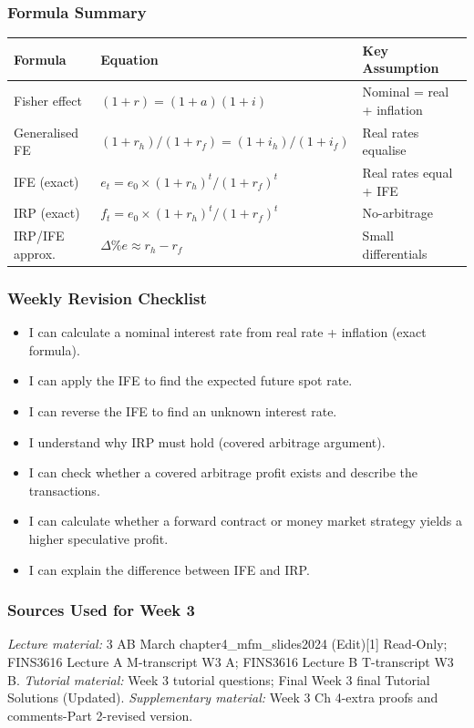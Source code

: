 \documentclass[11pt,a4paper]{article}
\newcommand{\cb}{\(\square\)\enspace}
\begin{document}
\subsubsection*{Formula Summary}
\begin{center}
\begin{tabular}{lll}
\toprule
\textbf{Formula} & \textbf{Equation} & \textbf{Key Assumption} \\
\midrule
Fisher effect & $(1+r) = (1+a)(1+i)$ & Nominal = real + inflation \\
Generalised FE & $(1+r_h)/(1+r_f) = (1+i_h)/(1+i_f)$ & Real rates equalise \\
IFE (exact) & $e_t = e_0 \times (1+r_h)^t/(1+r_f)^t$ & Real rates equal + IFE \\
IRP (exact) & $f_t = e_0 \times (1+r_h)^t/(1+r_f)^t$ & No-arbitrage \\
IRP/IFE approx. & $\Delta\%e \approx r_h - r_f$ & Small differentials \\
\bottomrule
\end{tabular}
\end{center}

\subsubsection*{Weekly Revision Checklist}
\begin{itemize}[leftmargin=2em]
  \item[\cb] I can calculate a nominal interest rate from real rate + inflation (exact formula).
  \item[\cb] I can apply the IFE to find the expected future spot rate.
  \item[\cb] I can reverse the IFE to find an unknown interest rate.
  \item[\cb] I understand why IRP must hold (covered arbitrage argument).
  \item[\cb] I can check whether a covered arbitrage profit exists and describe the transactions.
  \item[\cb] I can calculate whether a forward contract or money market strategy yields a higher speculative profit.
  \item[\cb] I can explain the difference between IFE and IRP.
\end{itemize}

\subsubsection*{Sources Used for Week 3}
\textit{Lecture material:} 3 AB March chapter4\_mfm\_slides2024 (Edit)[1] Read-Only; FINS3616 Lecture A M-transcript W3 A; FINS3616 Lecture B T-transcript W3 B. \textit{Tutorial material:} Week 3 tutorial questions; Final Week 3 final Tutorial Solutions (Updated). \textit{Supplementary material:} Week 3 Ch 4-extra proofs and comments-Part 2-revised version.
\end{document}
